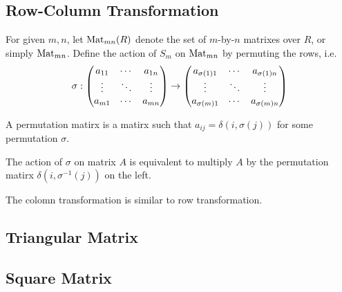 \subsection{Row-Column Transformation}
For given $m, n$, let ${\mathop{\mathrm{Mat}}}_{mn}(R)$ denote the set of $m$-by-$n$ matrixes over $R$,
or simply ${\mathop{\mathrm{Mat}}}_{mn}$. Define the action of $S_m$ on ${\mathop{\mathrm{Mat}}}_{mn}$ by permuting
the rows, i.e.
\begin{equation*}
\sigma :
\left(\begin{matrix}
a_{11} & \cdots & a_{1n} \cr
\vdots & \ddots & \vdots \cr
a_{m1} & \cdots & a_{mn}
\end{matrix}\right)
\to
\left(\begin{matrix}
a_{\sigma(1) 1} & \cdots & a_{\sigma(1) n} \cr
\vdots & \ddots & \vdots \cr
a_{\sigma(m) 1} & \cdots & a_{\sigma(m) n}
\end{matrix}\right)
\end{equation*}

A permutation matirx is a matirx such that $a_{ij} = \delta(i, \sigma(j))$ for
some permutation $\sigma$.
\begin{pro}
The action of $\sigma$ on matrix $A$ is equivalent to multiply $A$ by the
permutation matirx $\delta(i, \sigma^{-1}(j))$ on the left.
\end{pro}

The colomn transformation is similar to row transformation.

\subsection{Triangular Matrix}

\subsection{Square Matrix}
